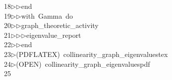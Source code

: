 \begin{tabbing}
18\>$\triangleright$\>$\triangleright$\>end\ \\[0pt]
19\>$\triangleright$\>$\triangleright$\>with\ Gamma\ do\ \\[0pt]
20\>$\triangleright$\>$\triangleright$\>graph\_theoretic\_activity\ \\[0pt]
21\>$\triangleright$\>$\triangleright$\>$\triangleright$\>eigenvalue\_report\ \\[0pt]
22\>$\triangleright$\>$\triangleright$\>end\\[0pt]
23\>$\triangleright$\>(PDFLATEX)\ collinearity\_graph\_eigenvaluestex\\[0pt]
24\>$\triangleright$\>(OPEN)\ collinearity\_graph\_eigenvaluespdf\\[0pt]
25\>\end{tabbing}

